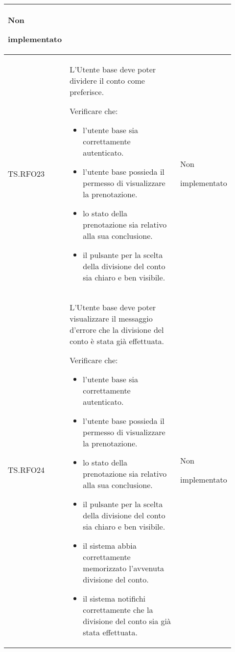 \begin{longtable}{|p{0.10\linewidth}|p{0.70\linewidth}|p{0.12\linewidth}|}
	Non \par implementato                                                                                                                                                   \\
	\hline
	TS.RFO23                                                                                                                        &
	L’Utente base deve poter dividere il conto come preferisce.   \par
	Verificare che:
	\begin{itemize}
		\item l'utente base sia correttamente autenticato.
		\item l'utente base possieda il permesso di visualizzare la prenotazione.
		\item lo stato della prenotazione sia relativo alla sua conclusione.
		\item il pulsante per la scelta della divisione del conto sia chiaro e ben visibile.
	\end{itemize}                                            &
	Non \par implementato                                                                                                                                                   \\
	\hline
	TS.RFO24                                                                                                                        &
	L’Utente base deve poter visualizzare il messaggio d’errore che la divisione del conto è stata già effettuata.   \par
	Verificare che:
	\begin{itemize}
		\item l'utente base sia correttamente autenticato.
		\item l'utente base possieda il permesso di visualizzare la prenotazione.
		\item lo stato della prenotazione sia relativo alla sua conclusione.
		\item il pulsante per la scelta della divisione del conto sia chiaro e ben visibile.
		\item il sistema abbia correttamente memorizzato l'avvenuta divisione del conto.
		\item il sistema notifichi correttamente che la divisione del conto sia già stata effettuata.
	\end{itemize}                                   &
	Non \par implementato                                                                                                                                                   \\

\end{longtable}
